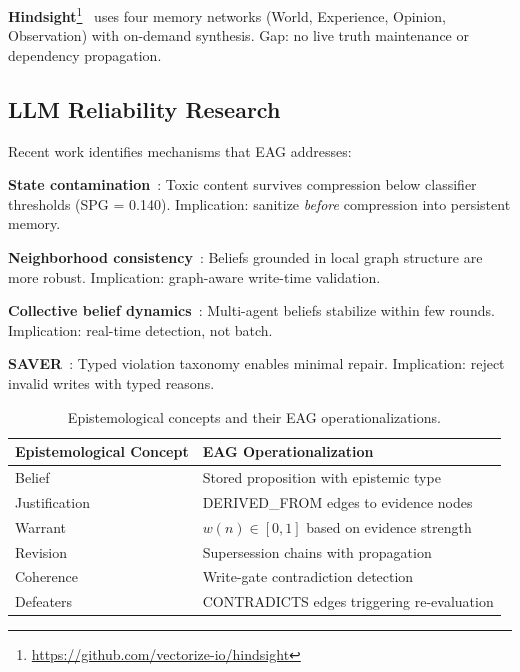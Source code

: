 \documentclass[11pt,letterpaper]{article}
\begin{document}
\textbf{Hindsight}\footnote{\url{https://github.com/vectorize-io/hindsight}}~\cite{hindsight} uses four memory networks (World, Experience, Opinion, Observation) with on-demand synthesis. Gap: no live truth maintenance or dependency propagation.

\subsection{LLM Reliability Research}

Recent work identifies mechanisms that EAG addresses:

\textbf{State contamination}~\cite{wang2026contamination}: Toxic content survives compression below classifier thresholds (SPG = 0.140). Implication: sanitize \textit{before} compression into persistent memory.

\textbf{Neighborhood consistency}~\cite{xu2026ncb}: Beliefs grounded in local graph structure are more robust. Implication: graph-aware write-time validation.

\textbf{Collective belief dynamics}~\cite{he2026collective}: Multi-agent beliefs stabilize within few rounds. Implication: real-time detection, not batch.

\textbf{SAVER}~\cite{yuan2026saver}: Typed violation taxonomy enables minimal repair. Implication: reject invalid writes with typed reasons.

\begin{table}[H]
\centering
\caption{Epistemological concepts and their EAG operationalizations.}
\label{tab:concepts}
\begin{tabular}{@{}ll@{}}
\toprule
\textbf{Epistemological Concept} & \textbf{EAG Operationalization} \\
\midrule
Belief & Stored proposition with epistemic type \\
Justification & DERIVED\_FROM edges to evidence nodes \\
Warrant & $w(n) \in [0,1]$ based on evidence strength \\
Revision & Supersession chains with propagation \\
Coherence & Write-gate contradiction detection \\
Defeaters & CONTRADICTS edges triggering re-evaluation \\
\bottomrule
\end{tabular}
\end{table}

\end{document}
